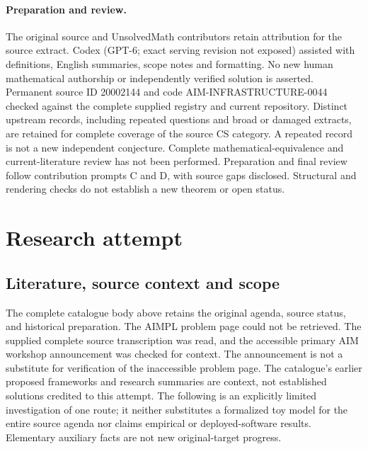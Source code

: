 \documentclass[11pt]{article}
\begin{document}
\paragraph{Preparation and review.}
The original source and UnsolvedMath contributors retain attribution for the source extract. Codex (GPT-6; exact serving revision not exposed) assisted with definitions, English summaries, scope notes and formatting. No new human mathematical authorship or independently verified solution is asserted. Permanent source ID 20002144 and code AIM-INFRASTRUCTURE-0044 checked against the complete supplied registry and current repository. Distinct upstream records, including repeated questions and broad or damaged extracts, are retained for complete coverage of the source CS category. A repeated record is not a new independent conjecture. Complete mathematical-equivalence and current-literature review has not been performed. Preparation and final review follow contribution prompts C and D, with source gaps disclosed. Structural and rendering checks do not establish a new theorem or open status.
\label{end:20002144}

\section{Research attempt}
\subsection{Literature, source context and scope}
The complete catalogue body above retains the original agenda, source status, and historical preparation. The AIMPL problem page could not be retrieved. The supplied complete source transcription was read, and the accessible primary AIM workshop announcement was checked for context. The announcement is not a substitute for verification of the inaccessible problem page. The catalogue's earlier proposed frameworks and research summaries are context, not established solutions credited to this attempt. The following is an explicitly limited investigation of one route; it neither substitutes a formalized toy model for the entire source agenda nor claims empirical or deployed-software results. Elementary auxiliary facts are not new original-target progress.
\end{document}
